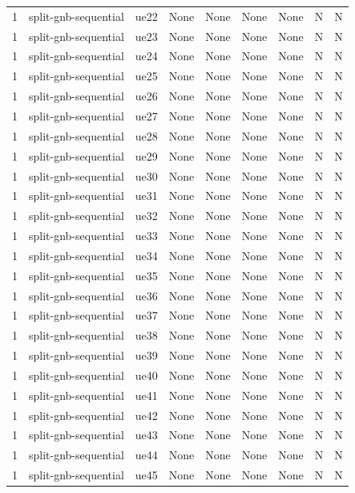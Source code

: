 \begin{table}[ht]
\begin{tabular}{|c|c|c|c|c|c|c|c|c|}
1 & split-gnb-sequential & ue22 & None & None & None & None & N & N \\
1 & split-gnb-sequential & ue23 & None & None & None & None & N & N \\
1 & split-gnb-sequential & ue24 & None & None & None & None & N & N \\
1 & split-gnb-sequential & ue25 & None & None & None & None & N & N \\
1 & split-gnb-sequential & ue26 & None & None & None & None & N & N \\
1 & split-gnb-sequential & ue27 & None & None & None & None & N & N \\
1 & split-gnb-sequential & ue28 & None & None & None & None & N & N \\
1 & split-gnb-sequential & ue29 & None & None & None & None & N & N \\
1 & split-gnb-sequential & ue30 & None & None & None & None & N & N \\
1 & split-gnb-sequential & ue31 & None & None & None & None & N & N \\
1 & split-gnb-sequential & ue32 & None & None & None & None & N & N \\
1 & split-gnb-sequential & ue33 & None & None & None & None & N & N \\
1 & split-gnb-sequential & ue34 & None & None & None & None & N & N \\
1 & split-gnb-sequential & ue35 & None & None & None & None & N & N \\
1 & split-gnb-sequential & ue36 & None & None & None & None & N & N \\
1 & split-gnb-sequential & ue37 & None & None & None & None & N & N \\
1 & split-gnb-sequential & ue38 & None & None & None & None & N & N \\
1 & split-gnb-sequential & ue39 & None & None & None & None & N & N \\
1 & split-gnb-sequential & ue40 & None & None & None & None & N & N \\
1 & split-gnb-sequential & ue41 & None & None & None & None & N & N \\
1 & split-gnb-sequential & ue42 & None & None & None & None & N & N \\
1 & split-gnb-sequential & ue43 & None & None & None & None & N & N \\
1 & split-gnb-sequential & ue44 & None & None & None & None & N & N \\
1 & split-gnb-sequential & ue45 & None & None & None & None & N & N \\

\end{tabular}
\end{table}
